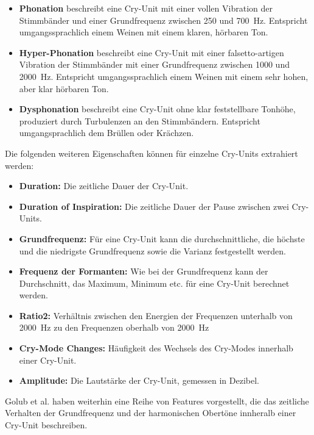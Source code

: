 \begin{itemize}
	\item \textbf{Phonation} beschreibt eine Cry-Unit mit einer \glqq vollen Vibration der Stimmbänder\grqq{} und einer Grundfrequenz zwischen 250 und \SI{700}{\hertz}. Entspricht umgangssprachlich einem Weinen mit einem \glqq klaren, hörbaren Ton\grqq{}.
	\item \textbf{Hyper-Phonation} beschreibt eine Cry-Unit mit einer \glqq falsetto-artigen Vibration der Stimmbänder\grqq{} mit einer Grundfrequenz zwischen 1000 und \SI{2000}{\hertz}. Entspricht umgangssprachlich einem Weinen mit einem \glqq sehr hohen, aber klar hörbaren Ton\grqq{}.
	\item \textbf{Dysphonation} beschreibt eine Cry-Unit ohne klar feststellbare Tonhöhe, produziert durch Turbulenzen an den Stimmbändern. Entspricht umgangsprachlich dem \glqq Brüllen oder Krächzen\grqq{}.
\end{itemize}

Die folgenden weiteren Eigenschaften können für einzelne Cry-Units extrahiert werden:

\begin{itemize}
	\item \textbf{Duration:} Die zeitliche Dauer der Cry-Unit.
	\item \textbf{Duration of Inspiration: }Die zeitliche Dauer der Pause zwischen zwei Cry-Units.
	\item \textbf{Grundfrequenz:} Für eine Cry-Unit kann die durchschnittliche, die höchste und die niedrigste Grundfrequenz sowie die Varianz festgestellt werden.
	\item \textbf{Frequenz der Formanten:} Wie bei der Grundfrequenz kann der Durchschnitt, das Maximum, Minimum etc. für eine Cry-Unit berechnet werden.
	\item \textbf{Ratio2: } Verhältnis zwischen den Energien der Frequenzen unterhalb von \SI{2000}{\hertz} zu den Frequenzen oberhalb von \SI{2000}{\hertz}
	\item \textbf{Cry-Mode Changes:} Häufigkeit des Wechsels des Cry-Modes innerhalb einer Cry-Unit.
	\item \textbf{Amplitude:} Die Lautstärke der Cry-Unit, gemessen in Dezibel. \cite[S. 85]{parentalPerception} \cite[S. 156]{threeCryTypes}
\end{itemize}

Golub et al. haben weiterhin eine Reihe von Features vorgestellt, die das zeitliche Verhalten der Grundfrequenz und der harmonischen Obertöne innheralb einer Cry-Unit beschreiben. \cite[S. 73]{cryModel}

